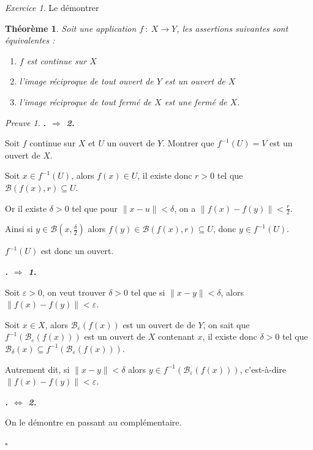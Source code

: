 \documentclass[]{article}
\newtheorem{mythm}{Théorème}
\theoremstyle{remark}
\newtheorem{myexer}{Exercice}
\newtheorem{myproof}{Preuve}
\theoremstyle{definition}
\newcommand{\cqfd}{
	\hfill$\square$
}
\newenvironment{proofpart}[1]{
	\leavevmode
	
	\noindent
	{\textit{\textbf{\boldmath #1}}}
	
}{
	\checkmark
}
\begin{document}
\begin{myexer}
	Le démontrer
\end{myexer}

\begin{mythm}
	Soit une application $f~:~X \longrightarrow Y$, les assertions suivantes sont équivalentes :
	\begin{enumerate}
	 \item $f$ est continue sur $X$
	 \item l'image réciproque de tout ouvert de $Y$ est un ouvert de $X$
	 \item l'image réciproque de tout fermé de $X$ est une fermé de $X$.
 	\end{enumerate}
\end{mythm}

\begin{myproof}
	\begin{proofpart}{1. $\Longrightarrow$ 2.}
		Soit $f$ continue sur $X$ et $U$ un ouvert de $Y$. Montrer que $f^{-1}(U)=V$ est un ouvert de $X$.
		
		Soit $x \in f^{-1}(U)$, alors $f(x) \in U$, il existe donc $r>0$ tel que $\mathcal{B}(f(x), r) \subseteq U$.
		
		Or il existe $\delta > 0$ tel que pour $\|x-u\| < \delta$, on a $\|f(x)-f(y)\| < \frac{r}{2}$.
		
		Ainsi si $y \in \mathcal{B}\left(x, \frac{\delta}{2}\right)$ alors $f(y) \in \mathcal{B}(f(x), r) \subseteq U$, donc $y \in f^{-1}(U)$.
		
		$f^{-1}(U)$ est donc un ouvert.
	\end{proofpart}
	
	\begin{proofpart}{2. $\Longrightarrow$ 1.}
		Soit $\varepsilon > 0$, on veut trouver $\delta > 0$ tel que si $\|x-y\| < \delta$, alors $\|f(x)-f(y)\| < \varepsilon$.
	
		Soit $x \in X$, alors $\mathcal{B}_\varepsilon(f(x))$ est un ouvert de de $Y$, on sait que $f^{-1}(\mathcal{B}_\varepsilon(f(x)))$ est un ouvert de $X$ contenant $x$, il existe donc $\delta > 0$ tel que $\mathcal{B}_\delta(x) \subseteq f^{-1}(\mathcal{B}_\varepsilon(f(x)))$.
		
		Autrement dit, si $\|x-y\| < \delta$ alors $y \in f^{-1}(\mathcal{B}_\varepsilon(f(x)))$, c'est-à-dire $\|f(x)-f(y)\| < \varepsilon$.
	\end{proofpart}
	
	\begin{proofpart}{1. $\Longleftrightarrow$ 2.}
		On le démontre en passant au complémentaire.
	\end{proofpart}
	
	\cqfd
\end{myproof}
\end{document}
